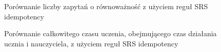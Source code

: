 

\begin{figure}[H]
\centering

\caption{Porównanie liczby zapytań o równoważność z użyciem reguł SRS idempotency}
\label{fig:idempotencyEq}
\end{figure}

\begin{figure}[H]
\centering

\caption{Porównanie całkowitego czasu uczenia, obejmującego czas działania ucznia i nauczyciela, z użyciem reguł SRS idempotency}
\label{fig:idempotencyTime}
\end{figure}
